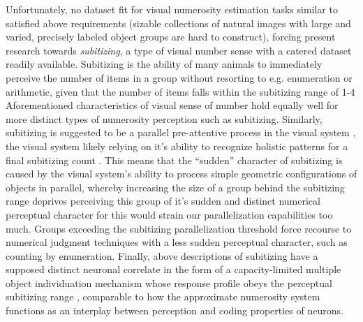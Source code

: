 \documentclass[twocolumn]{article}
\begin{document}
Unfortunately, no dataset fit for visual numerosity estimation tasks
similar to \citet{stoianov2012} satisfied above requirements (sizable
collections of natural images with large and varied, precisely labeled
object groups are hard to construct), forcing present research towards
\emph{subitizing}, a type of visual number sense with a catered
dataset readily available. Subitizing is the ability of many animals to
immediately perceive the number of items in a group without resorting to e.g. enumeration or arithmetic, given that the number of items falls within the
subitizing range of 1-4 \citep{kaufman1949, animalsnumericalcognition}
Aforementioned characteristics of visual sense of
number hold equally well for more distinct types of numerosity perception such as
subitizing. Similarly, subitizing is suggested to be a parallel
pre-attentive process in the visual system
\citep[p.~57]{dehaene2011number}, the visual system likely relying on
it's ability to recognize holistic patterns for a final subitizing count
\citetext{\citealp{jansen2014role}; \citealp[p.~57]{dehaene2011number}; \citealp{piazza2002subitizing}}.
This means that the ``sudden'' character of subitizing is caused by the
visual system's ability to process simple geometric configurations of
objects in parallel, whereby increasing the size of a group behind the
subitizing range deprives perceiving this group of it's sudden and
distinct numerical perceptual character for this would strain our
parallelization capabilities too much. Groups exceeding the subitizing parallelization threshold force recourse to numerical judgment techniques with a less sudden perceptual character, such as counting by enumeration. Finally, above descriptions of subitizing have a supposed distinct neuronal correlate in the form of a capacity-limited multiple object individuation mechanism whose response profile obeys the perceptual subitizing range \citep{poncet2016individuation}, comparable to how the approximate numerosity system functions as an interplay between perception and coding properties of neurons.\\
\end{document}
